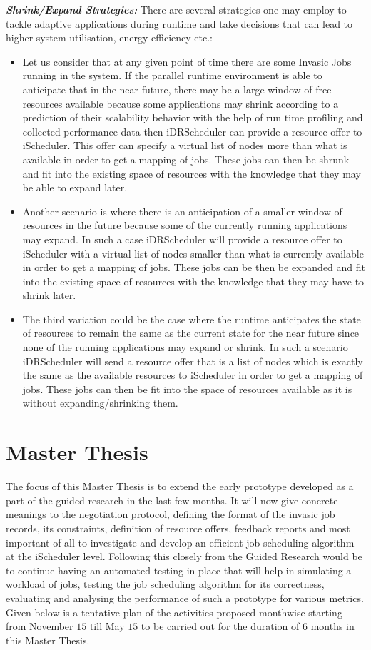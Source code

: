\noindent
\textbf{\textit{Shrink/Expand Strategies: }}There are several strategies one may employ to tackle adaptive applications during runtime and take decisions that can lead to higher system utilisation, energy efficiency etc.:
\begin{itemize} 
\item Let us consider that at any given point of time there are some Invasic Jobs running in the system. If the parallel runtime environment is able to anticipate that in the near future, there may be a large window of free resources available because some applications may shrink according to a prediction of their scalability behavior with the help of run time profiling and collected performance data then iDRScheduler can provide a resource offer to iScheduler. This offer can specify a virtual list of nodes more than what is available in order to get a mapping of jobs. These jobs can then be shrunk and fit into the existing space of resources with the knowledge that they may be able to expand later.
\item Another scenario is where there is an anticipation of a smaller window of resources in the future because some of the currently running applications may expand. In such a case iDRScheduler will provide a resource offer to iScheduler with a virtual list of nodes smaller than what is currently available in order to get a mapping of jobs. These jobs can be then be expanded and fit into the existing space of resources with the knowledge that they may have to shrink later.
\item The third variation could be the case where the runtime anticipates the state of resources to remain the same as the current state for the near future since none of the running applications may expand or shrink. In such a scenario iDRScheduler will send a resource offer that is a list of nodes which is exactly the same as the available resources to iScheduler in order to get a mapping of jobs. These jobs can then be fit into the space of resources available as it is without expanding/shrinking them. 
\end{itemize}
\section{Master Thesis}
The focus of this Master Thesis is to extend the early prototype developed as a part of the guided research in the last few months. It will now give concrete meanings to the negotiation protocol, defining the format of the invasic job records, its constraints, definition of resource offers, feedback reports and most important of all to investigate and develop an efficient job scheduling algorithm at the iScheduler level. Following this closely from the Guided Research would be to continue having an automated testing in place that will help in simulating a workload of jobs, testing the job scheduling algorithm for its correctness, evaluating and analysing the performance of such a prototype for various metrics. Given below is a tentative plan of the activities proposed monthwise starting from November $15$ till May $15$ to be carried out for the duration of 6 months in this Master Thesis.\par
